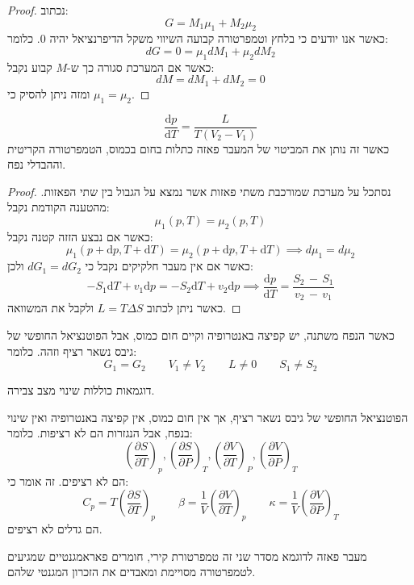 \documentclass{tstextbook}
\begin{document}
\begin{proof}
נכתוב:
$$G=M_{1}\mu_{1}+M_{2}\mu_{2}$$
כאשר אנו יודעים כי בלחץ וטמפרטורה קבועה השיווי משקל הדיפרנציאל יהיה 0. כלומר:
$$dG=0=\mu_{1}dM_{1}+\mu_{2}dM_{2}$$
כאשר אם המערכת סגורה כך ש-\(M\) קבוע נקבל:
$$dM=dM_{1}+dM_{2}=0$$
ומזה ניתן להסיק כי \(\mu_{1}=\mu_{2}\).

\end{proof}
\begin{proposition}
$${\frac{\mathrm{d}p}{\mathrm{d}T}}={\frac{L}{T(V_{2}-V_{1})}}$$
כאשר זה נותן את המביטוי של המעבר פאזה כתלות בחום בכמוס, הטמפרטורה הקריטית וההבדלי נפח.

\end{proposition}
\begin{proof}
נסתכל על מערכת שמורכבת משתי פאזות אשר נמצא על הגבול בין שתי הפאזות. מהטענה הקודמת נקבל:
$$\mu_{1}(p,T)=\mu_{2}(p,T)$$
כאשר אם נבצע הזזה קטנה נקבל:
$$\mu_{1}\left( p+\mathrm{d}p,T+\mathrm{d}T \right)=\mu_{2}\left( p+\mathrm{d}p,T+\mathrm{d}T \right)\implies d\mu_{1}=d\mu_{2}$$
כאשר אם אין מעבר חלקיקים נקבל כי \(dG_{1}=dG_{2}\) ולכן:
$$-S_{1}\mathrm{d}T+v_{1}\mathrm{d}p=-S_{2}\mathrm{d}T+v_{2}\mathrm{d}p \implies \frac{\mathrm{d}p}{\mathrm{d}T}=\frac{S_{2}\,-\,S_{1}}{v_{2}\,-\,v_{1}}$$
כאשר ניתן לכתוב \(L=T\Delta S\) ולקבל את המשוואה.

\end{proof}
\begin{definition}
כאשר הנפח משתנה, יש קפיצה באנטרופיה וקיים חום כמוס, אבל הפוטנציאל החופשי של גיבס נשאר רציף וזהה. כלומר:
$$G_{1}=G_{2}\qquad V_{1}\neq V_{2}\qquad L\neq 0\qquad S_{1}\neq S_{2}$$

\end{definition}
דוגמאות כוללות שינוי מצב צבירה.

\begin{definition}
הפוטנציאל החופשי של גיבס נשאר רציף, אך אין חום כמוס, אין קפיצה באנטרופיה ואין שינוי בנפח, אבל הנגזרות הם לא רציפות. כלומר:
$$\left( \frac{\partial S}{\partial T}  \right)_{p},\left( \frac{\partial S}{\partial P}  \right)_{T},\left( \frac{\partial V}{\partial T}  \right)_{P},\left( \frac{\partial V}{\partial P}  \right)_{T}$$
הם לא רציפים. זה אומר כי:
$$C_{p}=T\left( \frac{\partial S}{\partial T}  \right)_{p}\qquad \beta=\frac{1}{V}\left( \frac{\partial V}{\partial T}  \right)_{p}\qquad \kappa=\frac{1}{V}\left( \frac{\partial V}{\partial P}  \right)_{T}$$
הם גדלים לא רציפים. 

\end{definition}
מעבר פאזה לדוגמא מסדר שני זה טמפרטורת קירי, חומרים פאראמגנטיים שמגיעים לטמפרטורה מסויימת ומאבדים את הזכרון המגנטי שלהם.
\end{document}
